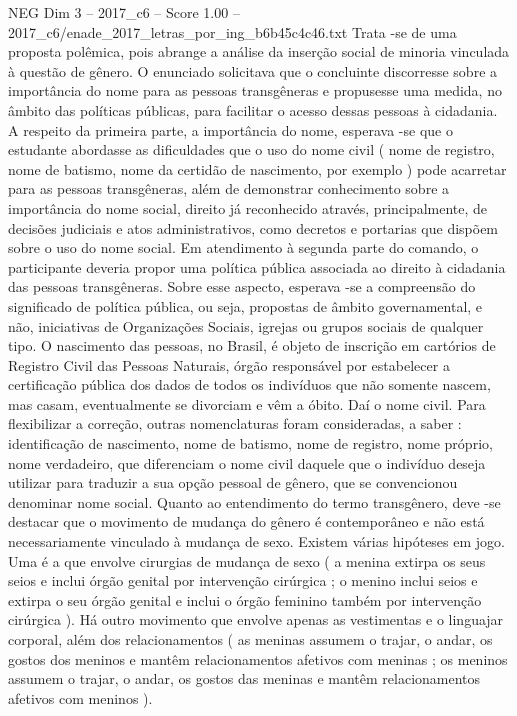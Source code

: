 \begin{textsample}{NEG Dim 3 – 2017\_c6 – Score 1.00 – 2017\_c6/enade\_2017\_letras\_por\_ing\_b6b45c4c46.txt}
Trata -se de uma proposta polêmica, pois abrange a análise da inserção social de minoria vinculada à questão de gênero.
O enunciado solicitava que o concluinte discorresse sobre a importância do nome para as pessoas transgêneras e propusesse uma medida, no âmbito das políticas públicas, para facilitar o acesso dessas pessoas à cidadania.
A respeito da primeira parte, a importância do nome, esperava -se que o estudante abordasse as dificuldades que o uso do nome civil ( nome de registro, nome de batismo, nome da certidão de nascimento, por exemplo ) pode acarretar para as pessoas transgêneras, além de demonstrar conhecimento sobre a importância do nome social, direito já reconhecido através, principalmente, de decisões judiciais e atos administrativos, como decretos e portarias que dispõem sobre o uso do nome social.
Em atendimento à segunda parte do comando, o participante deveria propor uma política pública associada ao direito à cidadania das pessoas transgêneras.
Sobre esse aspecto, esperava -se a compreensão do significado de política pública, ou seja, propostas de âmbito governamental, e não, iniciativas de Organizações Sociais, igrejas ou grupos sociais de qualquer tipo.
O nascimento das pessoas, no Brasil, é objeto de inscrição em cartórios de Registro Civil das Pessoas Naturais, órgão responsável por estabelecer a certificação pública dos dados de todos os indivíduos que não somente nascem, mas casam, eventualmente se divorciam e vêm a óbito.
Daí o nome civil.
Para flexibilizar a correção, outras nomenclaturas foram consideradas, a saber : identificação de nascimento, nome de batismo, nome de registro, nome próprio, nome verdadeiro, que diferenciam o nome civil daquele que o indivíduo deseja utilizar para traduzir a sua opção pessoal de gênero, que se convencionou denominar nome social.
Quanto ao entendimento do termo transgênero, deve -se destacar que o movimento de mudança do gênero é contemporâneo e não está necessariamente vinculado à mudança de sexo.
Existem várias hipóteses em jogo.
Uma é a que envolve cirurgias de mudança de sexo ( a menina extirpa os seus seios e inclui órgão genital por intervenção cirúrgica ; o menino inclui seios e extirpa o seu órgão genital e inclui o órgão feminino também por intervenção cirúrgica ).
Há outro movimento que envolve apenas as vestimentas e o linguajar corporal, além dos relacionamentos ( as meninas assumem o trajar, o andar, os gostos dos meninos e mantêm relacionamentos afetivos com meninas ; os meninos assumem o trajar, o andar, os gostos das meninas e mantêm relacionamentos afetivos com meninos ).

\end{textsample}
